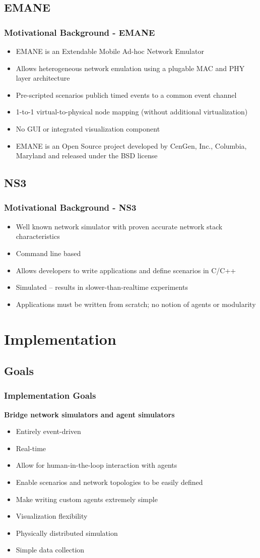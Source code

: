 \documentclass[mathserif,usenames,dvipsnames]{beamer}
\begin{document}
\subsection{EMANE}
\frame
{
    \frametitle{Motivational Background - EMANE}
    \begin{itemize}
	\item EMANE is an Extendable Mobile Ad-hoc Network Emulator
	\item Allows heterogeneous network emulation using a plugable MAC and PHY layer architecture
	\item Pre-scripted scenarios publich timed events to a common event channel
	\item 1-to-1 virtual-to-physical node mapping (without additional virtualization)
	\item No GUI or integrated visualization component
	\item EMANE is an Open Source project developed by CenGen, Inc., Columbia, Maryland and released under the BSD license
    \end{itemize}
}

\subsection{NS3}
\frame
{
    \frametitle{Motivational Background - NS3}
    \begin{itemize}
	\item Well known network simulator with proven accurate network stack characteristics
	\item Command line based
	\item Allows developers to write applications and define scenarios in C/C++
	\item Simulated -- results in slower-than-realtime experiments
	\item Applications must be written from scratch; no notion of agents or modularity
    \end{itemize}
}

\section{Implementation}
\subsection{Goals}
\frame
{
    \frametitle{Implementation Goals}
    \textbf{Bridge network simulators and agent simulators}
    \begin{itemize}
        \item Entirely event-driven
        \item Real-time
        \item Allow for human-in-the-loop interaction with agents
        \item Enable scenarios and network topologies to be easily defined
        \item Make writing custom agents extremely simple
        \item Visualization flexibility
        \item Physically distributed simulation
        \item Simple data collection
    \end{itemize}
}
\end{document}
